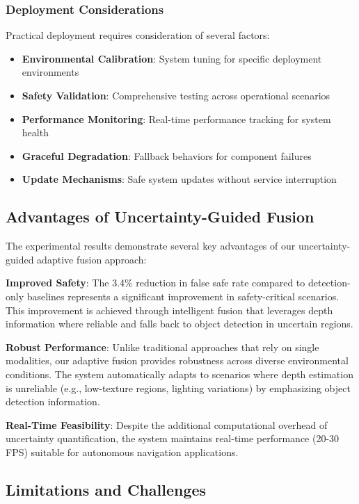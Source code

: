 \documentclass[10pt]{article}
\begin{document}
\subsubsection{Deployment Considerations}

Practical deployment requires consideration of several factors:

\begin{itemize}
\item \textbf{Environmental Calibration}: System tuning for specific deployment environments
\item \textbf{Safety Validation}: Comprehensive testing across operational scenarios
\item \textbf{Performance Monitoring}: Real-time performance tracking for system health
\item \textbf{Graceful Degradation}: Fallback behaviors for component failures
\item \textbf{Update Mechanisms}: Safe system updates without service interruption
\end{itemize}

\subsection{Advantages of Uncertainty-Guided Fusion}

The experimental results demonstrate several key advantages of our uncertainty-guided adaptive fusion approach:

\textbf{Improved Safety}: The 3.4\% reduction in false safe rate compared to detection-only baselines represents a significant improvement in safety-critical scenarios. This improvement is achieved through intelligent fusion that leverages depth information where reliable and falls back to object detection in uncertain regions.

\textbf{Robust Performance}: Unlike traditional approaches that rely on single modalities, our adaptive fusion provides robustness across diverse environmental conditions. The system automatically adapts to scenarios where depth estimation is unreliable (e.g., low-texture regions, lighting variations) by emphasizing object detection information.

\textbf{Real-Time Feasibility}: Despite the additional computational overhead of uncertainty quantification, the system maintains real-time performance (20-30 FPS) suitable for autonomous navigation applications.

\subsection{Limitations and Challenges}
\end{document}
